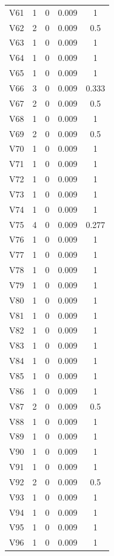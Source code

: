 \documentclass[a4paper, 12pt, openright, oneside, german, french, english, brazil]{abntex2}
\begin{document}
\begin{SingleSpace}
\begin{footnotesize}
\begin{center}
\begin{longtable}{c c c c c}
					V61 & 1 & 0 & 0.009 & 1 \\ 
					V62 & 2 & 0 & 0.009 & 0.5 \\ 
					V63 & 1 & 0 & 0.009 & 1 \\ 
					V64 & 1 & 0 & 0.009 & 1 \\ 
					V65 & 1 & 0 & 0.009 & 1 \\ 
					V66 & 3 & 0 & 0.009 & 0.333 \\ 
					V67 & 2 & 0 & 0.009 & 0.5 \\ 
					V68 & 1 & 0 & 0.009 & 1 \\ 
					V69 & 2 & 0 & 0.009 & 0.5 \\ 
					V70 & 1 & 0 & 0.009 & 1 \\ 
					V71 & 1 & 0 & 0.009 & 1 \\ 
					V72 & 1 & 0 & 0.009 & 1 \\ 
					V73 & 1 & 0 & 0.009 & 1 \\ 
					V74 & 1 & 0 & 0.009 & 1 \\ 
					V75 & 4 & 0 & 0.009 & 0.277 \\ 
					V76 & 1 & 0 & 0.009 & 1 \\ 
					V77 & 1 & 0 & 0.009 & 1 \\ 
					V78 & 1 & 0 & 0.009 & 1 \\ 
					V79 & 1 & 0 & 0.009 & 1 \\ 
					V80 & 1 & 0 & 0.009 & 1 \\ 
					V81 & 1 & 0 & 0.009 & 1 \\ 
					V82 & 1 & 0 & 0.009 & 1 \\ 
					V83 & 1 & 0 & 0.009 & 1 \\ 
					V84 & 1 & 0 & 0.009 & 1 \\ 
					V85 & 1 & 0 & 0.009 & 1 \\ 
					V86 & 1 & 0 & 0.009 & 1 \\ 
					V87 & 2 & 0 & 0.009 & 0.5 \\ 
					V88 & 1 & 0 & 0.009 & 1 \\ 
					V89 & 1 & 0 & 0.009 & 1 \\ 
					V90 & 1 & 0 & 0.009 & 1 \\ 
					V91 & 1 & 0 & 0.009 & 1 \\ 
					V92 & 2 & 0 & 0.009 & 0.5 \\ 
					V93 & 1 & 0 & 0.009 & 1 \\ 
					V94 & 1 & 0 & 0.009 & 1 \\ 
					V95 & 1 & 0 & 0.009 & 1 \\ 
					V96 & 1 & 0 & 0.009 & 1 \\ 

\end{longtable}
\end{center}
\end{footnotesize}
\end{SingleSpace}
\end{document}
